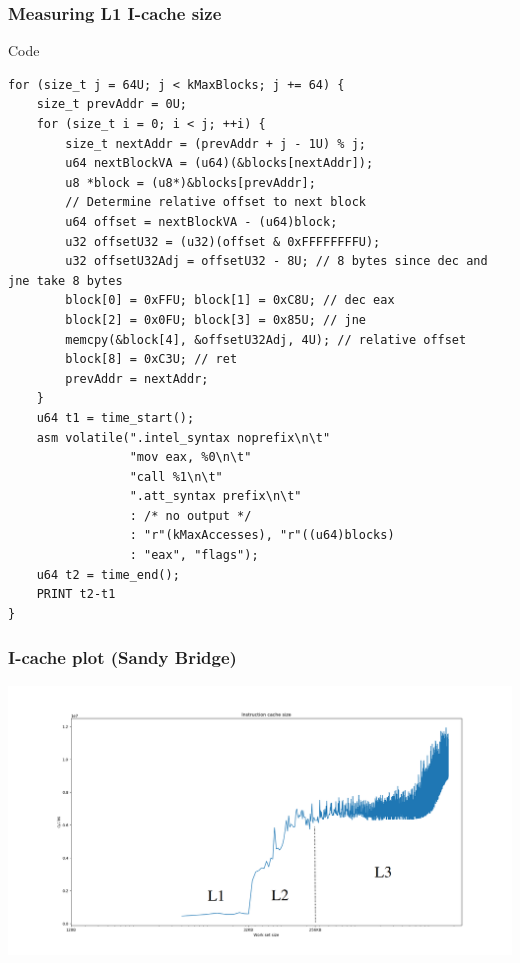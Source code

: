 \documentclass{beamer}
\begin{document}
\begin{frame}[fragile]
\frametitle{Measuring L1 I-cache size}
\begin{block}{Code}
\begin{lstlisting}[style=code]
for (size_t j = 64U; j < kMaxBlocks; j += 64) {
    size_t prevAddr = 0U;
    for (size_t i = 0; i < j; ++i) {
        size_t nextAddr = (prevAddr + j - 1U) % j;
        u64 nextBlockVA = (u64)(&blocks[nextAddr]);
        u8 *block = (u8*)&blocks[prevAddr];
        // Determine relative offset to next block
        u64 offset = nextBlockVA - (u64)block;
        u32 offsetU32 = (u32)(offset & 0xFFFFFFFFU);
        u32 offsetU32Adj = offsetU32 - 8U; // 8 bytes since dec and jne take 8 bytes
        block[0] = 0xFFU; block[1] = 0xC8U; // dec eax
        block[2] = 0x0FU; block[3] = 0x85U; // jne
        memcpy(&block[4], &offsetU32Adj, 4U); // relative offset
        block[8] = 0xC3U; // ret
        prevAddr = nextAddr;
    }
    u64 t1 = time_start();
    asm volatile(".intel_syntax noprefix\n\t"
                 "mov eax, %0\n\t"
                 "call %1\n\t"
                 ".att_syntax prefix\n\t"
                 : /* no output */
                 : "r"(kMaxAccesses), "r"((u64)blocks)
                 : "eax", "flags");
    u64 t2 = time_end();
    PRINT t2-t1
}

\end{lstlisting}
\end{block}
\end{frame}

\begin{frame}
\frametitle{I-cache plot (Sandy Bridge)}
\includegraphics[scale=.18]{img/instr_size.png}
\end{frame}
\end{document}
